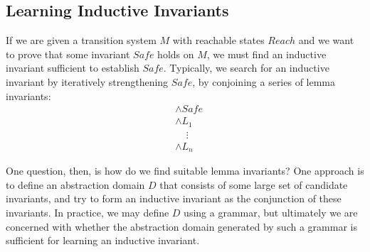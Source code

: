 \documentclass[10pt]{article}
\begin{document}
\subsection*{Learning Inductive Invariants}

If we are given a transition system $M$ with reachable states $Reach$ and we want to prove that some invariant $Safe$ holds on $M$, we must find an inductive invariant sufficient to establish $Safe$. Typically, we search for an inductive invariant by iteratively strengthening $Safe$, by conjoining a series of lemma invariants:
\begin{align*}
    &\wedge Safe \\
    &\wedge L_1 \\
    &\phantom{\wedge}\vdots \\
    &\wedge L_n
\end{align*}


One question, then, is how do we find suitable lemma invariants? One approach is to define an abstraction domain $D$ that consists of some large set of candidate invariants, and try to form an inductive invariant as the conjunction of these invariants. In practice, we may define $D$ using a grammar, but ultimately we are concerned with whether the abstraction domain generated by such a grammar is sufficient for learning an inductive invariant.
\end{document}
